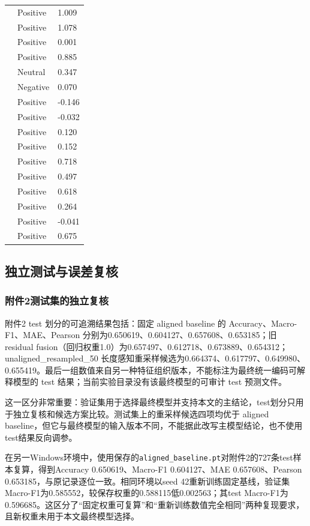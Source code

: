 \documentclass{gmcmthesis}
\newcommand{\code}[1]{\texttt{#1}}
\begin{document}
\begin{longtable}{C{0.33\textwidth}C{0.22\textwidth}C{0.22\textwidth}}
\texttt{} & Positive & 1.009 \\
\texttt{} & Positive & 1.078 \\
\texttt{} & Positive & 0.001 \\
\texttt{} & Positive & 0.885 \\
\texttt{} & Neutral & 0.347 \\
\texttt{} & Negative & 0.070 \\
\texttt{} & Positive & -0.146 \\
\texttt{} & Positive & -0.032 \\
\texttt{} & Positive & 0.120 \\
\texttt{} & Positive & 0.152 \\
\texttt{} & Positive & 0.718 \\
\texttt{} & Positive & 0.497 \\
\texttt{} & Positive & 0.618 \\
\texttt{} & Positive & 0.264 \\
\texttt{} & Positive & -0.041 \\
\texttt{} & Positive & 0.675 \\
\bottomrule
\end{longtable}
\subsection{独立测试与误差复核}
\subsubsection{附件2测试集的独立复核}
附件2 test 划分的可追溯结果包括：固定 aligned baseline 的 Accuracy、Macro-F1、MAE、Pearson 分别为0.650619、0.604127、0.657608、0.653185；旧 residual fusion（回归权重1.0）为0.657497、0.612718、0.673889、0.654312；unaligned\_resampled\_50 长度感知重采样候选为0.664374、0.617797、0.649980、0.655419。最后一组数值来自另一种特征组织版本，不能标注为最终统一编码可解释模型的 test 结果；当前实验目录没有该最终模型的可审计 test 预测文件。
\par\indent 这一区分非常重要：验证集用于选择最终模型并支持本文的主结论，test划分只用于独立复核和候选方案比较。测试集上的重采样候选四项均优于 aligned baseline，但它与最终模型的输入版本不同，不能据此改写主模型结论，也不使用test结果反向调参。
\par\indent 在另一Windows环境中，使用保存的\code{aligned\_baseline.pt}对附件2的727条test样本复算，得到Accuracy 0.650619、Macro-F1 0.604127、MAE 0.657608、Pearson 0.653185，与原记录逐位一致。相同环境以seed 42重新训练固定基线，验证集Macro-F1为0.585552，较保存权重的0.588115低0.002563；其test Macro-F1为0.596685。这区分了“固定权重可复算”和“重新训练数值完全相同”两种复现要求，且新权重未用于本文最终模型选择。
\end{document}
